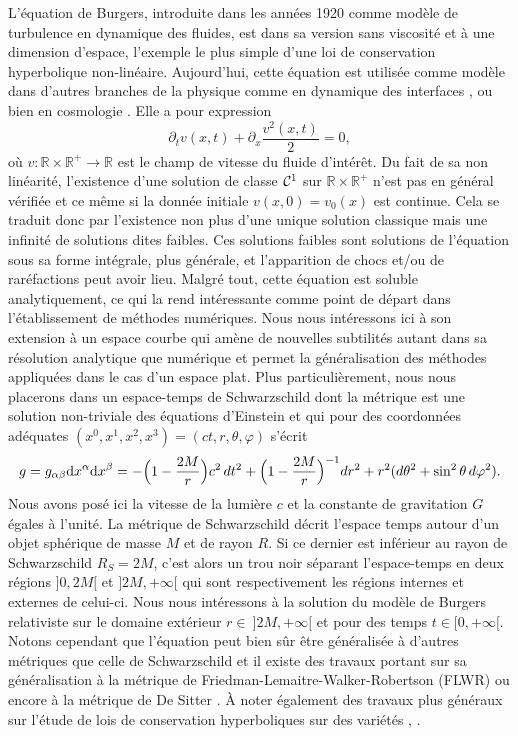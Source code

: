 \documentclass[11pt,a4paper]{article}
\begin{document}
L'équation de Burgers, introduite dans les années 1920 comme modèle de turbulence en dynamique des fluides, est dans sa version sans viscosité et à une dimension d'espace, l'exemple le plus simple d'une loi de conservation hyperbolique non-linéaire. Aujourd'hui, cette équation est utilisée comme modèle dans d'autres branches de la physique comme en dynamique des interfaces \cite{kardar1986dynamic}, ou bien en cosmologie \cite{shandarin1997three}. Elle a pour expression
\begin{equation}\label{Burgers_standard}
	\partial_t v(x,t) + \partial_x \frac{v^2(x,t)}{2} = 0,
\end{equation}
où $v : \mathbb{R}\times\mathbb{R^+} \rightarrow \mathbb{R}$ est le champ de vitesse du fluide d'intérêt. Du fait de sa non linéarité, l'existence d'une solution de classe ${\cal{C}}^1$ sur $\mathbb{R}\times\mathbb{R^+}$ n'est pas en général vérifiée et ce même si la donnée initiale $v(x,0) = v_0(x)$ est continue. Cela se traduit donc par l'existence non plus d'une unique solution classique mais une infinité de solutions dites faibles. Ces solutions faibles sont solutions de l'équation sous sa forme intégrale, plus générale, et l'apparition de chocs et/ou de raréfactions peut avoir lieu. Malgré tout, cette équation est soluble analytiquement, ce qui la rend intéressante comme point de départ dans l'établissement de méthodes numériques. Nous nous intéressons ici à son extension à un espace courbe qui amène de nouvelles subtilités autant dans sa résolution analytique que numérique et permet la généralisation des méthodes appliquées dans le cas d'un espace plat. Plus particulièrement, nous nous placerons dans un espace-temps de Schwarzschild  dont la métrique est une solution non-triviale des équations d'Einstein et qui pour des coordonnées adéquates $(x^0,x^1,x^2,x^3)= (ct, r,\theta, \varphi)$ s'écrit 
\begin{equation}\label{Scharz} 
g = g_{\alpha\beta} \mathrm{d}x^\alpha\mathrm{d}x^\beta = - \Big(1 - {2 M \over r} \Big) c^2 \, dt^2 + \Big(1 - {2 M \over r} \Big)^{-1} dr^2 + r^2 (d\theta^2+\sin^2 \theta \, d\varphi^2). 
\end{equation}
Nous avons posé ici la vitesse de la lumière $c$ et la constante de gravitation $G$ égales à l'unité. La métrique de Schwarzschild décrit l'espace temps autour d'un objet sphérique de masse $M$ et de rayon $R$. Si ce dernier est inférieur au rayon de Schwarzschild $R_S = 2M$, c'est alors un trou noir séparant l'espace-temps en deux régions $]0,2M[$ et $]2M,+\infty[$ qui sont respectivement les régions internes et externes de celui-ci. Nous nous intéressons à la solution du modèle de Burgers relativiste sur le domaine extérieur $r\in ~]2M, +\infty[$ et pour des temps $t\in [0, + \infty[$. Notons cependant que l'équation peut bien sûr être généralisée à d'autres métriques que celle de Schwarzschild \cite{lefloch2012relativistic} et il existe des travaux portant sur sa généralisation à la métrique de Friedman-Lemaitre-Walker-Robertson (FLWR) \cite{ceylan2015relativistic} ou encore à la métrique de De Sitter \cite{ceylan2014derivation}. \`{A} noter également des travaux plus généraux sur l'étude de lois de conservation hyperboliques sur des variétés \cite{ben2007well}, \cite{lefloch2011hyperbolic}.
\end{document}
